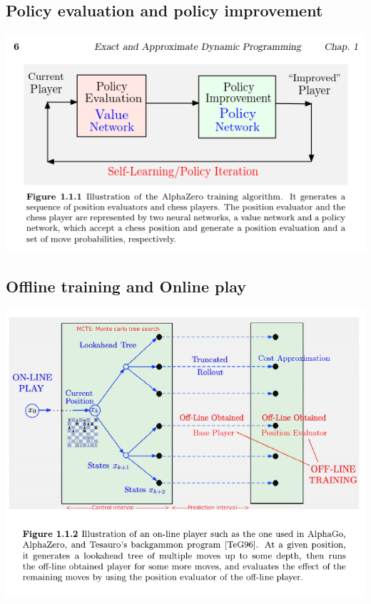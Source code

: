 \hypertarget{policy-evaluation-and-policy-improvement}{%
\subsection{Policy evaluation and policy
improvement}\label{policy-evaluation-and-policy-improvement}}

\includegraphics[width=\linewidth]{assets/2025-01-23-fig-1.1.1.png}

\hypertarget{offline-training-and-online-play}{%
\subsection{Offline training and Online
play}\label{offline-training-and-online-play}}

\includegraphics[width=\linewidth]{assets/2025-01-23-fig-1.1.2.png}

